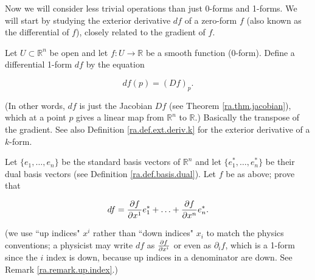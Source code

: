 Now we will consider less trivial operations than just 0-forms and 1-forms. We will start by studying the exterior derivative \(df\) of a zero-form \(f\) (also known as the differential of \(f\)), closely related to the gradient of \(f\).

\begin{definition}\label{ra.def.ext.deriv.0}

Let \(U \subset \mathbb{R}^n\) be open and let \(f: U \to \mathbb{R}\) be a smooth function (0-form). Define a differential 1-form \(df\) by the equation

\[
df(p) = (Df)_p.
\]

(In other words, \(df\) is just the Jacobian \(Df\) (see Theorem \ref{ra.thm.jacobian}), which at a point \(p\) gives a linear map from \(\mathbb{R}^n\) to \(\mathbb{R}\).) Basically the transpose of the gradient. See also Definition \ref{ra.def.ext.deriv.k} for the exterior derivative of a \(k\)-form.

\end{definition}

\begin{proposition}\label{ra.425b.hw13.3}

Let \(\{e_1, \ldots, e_n\}\) be the standard basis vectors of \(\mathbb{R}^n\) and let \(\{e_1^*, \ldots , e_n^*\}\) be their dual basis vectors (see Definition \ref{ra.def.basis.dual}). Let \(f\) be as above; prove that

\[
df = \pderiv{f}{x^1}e_1^* + \ldots + \pderiv{f}{x^n}e_n^*.
\]

(we use ``up indices" \(x^i\) rather than ``down indices" \(x_i\) to match the physics conventions; a physicist may write \(df\) as \(\pderiv{f}{x^i}\) or even as \(\partial_i f\), which is a 1-form since the \(i\) index is down, because up indices in a denominator are down. See Remark \ref{ra.remark.up.index}.)

\end{proposition}

